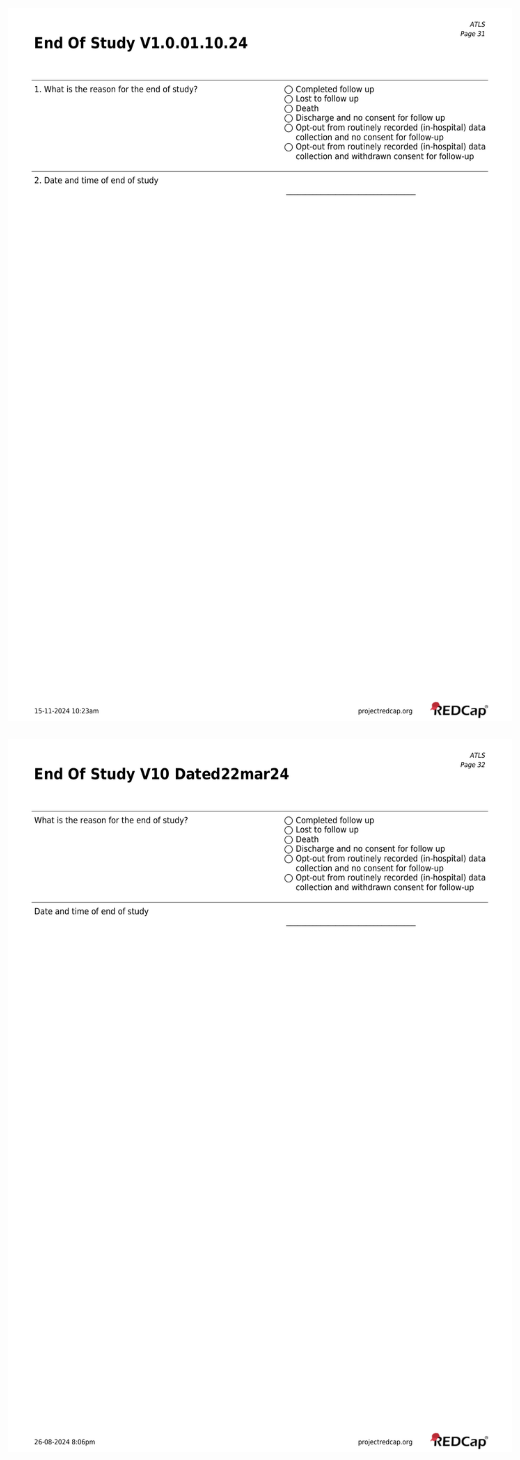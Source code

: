 \documentclass[
]{scrartcl}
\begin{document}
\includegraphics{../case-record-form/instrument-pdfs/pages/all-instruments-31.pdf}

\includegraphics{../case-record-form/instrument-pdfs/pages/all-instruments-32.pdf}
\end{document}
